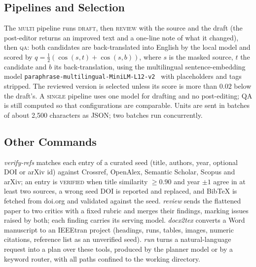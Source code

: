 \subsection{Pipelines and Selection}
\label{sec:pipelines}
The \textsc{multi} pipeline runs \textsc{draft}, then \textsc{review} with the source and the draft (the post-editor returns an improved text and a one-line note of what it changed), then \textsc{qa}: both candidates are back-translated into English by the local model and scored by $q=\tfrac12(\cos(s,t)+\cos(s,b))$, where $s$ is the masked source, $t$ the candidate and $b$ its back-translation, using the multilingual sentence-embedding model \texttt{paraphrase-multilingual-MiniLM-L12-v2}~\cite{reimers2020multilingual} with placeholders and tags stripped. The reviewed version is selected unless its score is more than $0.02$ below the draft's. A \textsc{single} pipeline uses one model for drafting and no post-editing; QA is still computed so that configurations are comparable. Units are sent in batches of about 2{,}500 characters as JSON; two batches run concurrently.

\subsection{Other Commands}
\emph{verify-refs} matches each entry of a curated seed (title, authors, year, optional DOI or arXiv id) against Crossref, OpenAlex, Semantic Scholar, Scopus and arXiv; an entry is \textsc{verified} when title similarity $\ge0.90$ and year $\pm1$ agree in at least two sources, a wrong seed DOI is reported and replaced, and BibTeX is fetched from doi.org and validated against the seed. \emph{review} sends the flattened paper to two critics with a fixed rubric and merges their findings, marking issues raised by both; each finding carries its serving model. \emph{docx2tex} converts a Word manuscript to an IEEEtran project (headings, runs, tables, images, numeric citations, reference list as an unverified seed). \emph{run} turns a natural-language request into a plan over these tools, produced by the planner model or by a keyword router, with all paths confined to the working directory.
